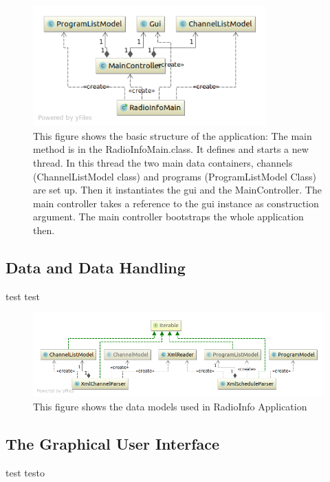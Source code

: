 \documentclass[a4paper,11pt,twoside]{article}
\begin{document}
\begin{figure}[ht!]
  \centering
  \includegraphics[width=0.8\textwidth]{basicUML.png}
  \caption{This figure shows the basic structure of the application: The main method is in the RadioInfoMain.class. It defines and starts a new thread. In this thread the two main data containers, channels (ChannelListModel class) and programs (ProgramListModel Class) are set up. Then it instantiates the gui and the MainController. The main controller takes a reference to the gui instance as construction argument. The main controller bootstraps the whole application then.  }
  \label{fig:basic}
  \end{figure}


\subsection{Data and Data Handling}

test test
\begin{figure}[p]
  \centering
  \includegraphics[width=1\textwidth]{dataModelsUML.png}
  \caption{This figure shows the data models used in RadioInfo Application}
  \label{fig:dataModels}
\end{figure}


\subsection{The Graphical User Interface}
test testo
\end{document}
